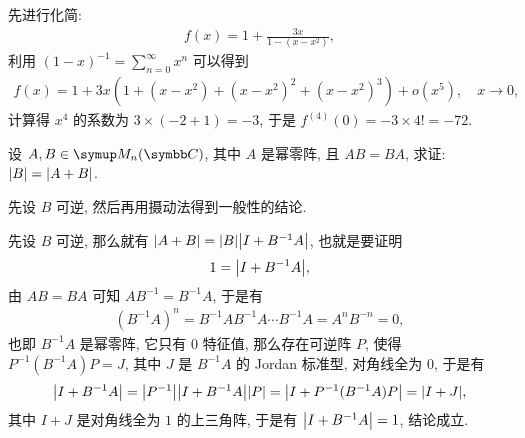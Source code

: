 \begin{exercise}[series=exer]
\begin{answer}
        先进行化简:
        \begin{align*}
            f(x) = 1 + \frac{3x}{1-(x - x^{2})},
        \end{align*}
        利用 $ (1 - x)^{-1} = \sum_{n = 0}^{\infty} x^{n} $ 可以得到
        \begin{align*}
            f(x) = 1 + 3x (1 + (x - x^{2}) + (x - x^{2})^{2} + (x - x^{2})^{3}) + o(x^{5}), \quad x \to 0,
        \end{align*}
        计算得 $ x^{4} $ 的系数为 $ 3 \times (-2 + 1) = -3 $, 于是 $ f^{(4)}(0) = -3 \times 4! = -72 $.
    \end{answer}
    \item 设 $ A, B \in \MM[\C] $, 其中 $ A $ 是幂零阵, 且 $ AB = BA $, 求证: $ \abs{B} = \abs{A + B} $.
    \begin{hint}
        先设 $ B $ 可逆, 然后再用摄动法得到一般性的结论.
    \end{hint}
    \begin{answer}
        先设 $ B $ 可逆, 那么就有 $ \abs{A + B} = \abs{B}\abs{I + B^{-1}A} $, 也就是要证明
        \begin{align*}
            1 = \abs{I + B^{-1}A},
        \end{align*}
        由 $ AB = BA $ 可知 $ AB^{-1} = B^{-1}A $, 于是有
        \begin{align*}
            (B^{-1}A)^{n} = B^{-1}AB^{-1}A\dotsm B^{-1}A = A^{n}B^{-n} = 0,
        \end{align*}
        也即 $ B^{-1}A $ 是幂零阵, 它只有 $ 0 $ 特征值, 那么存在可逆阵 $ P $, 使得 $ P^{-1}(B^{-1}A)P = J $, 其中 $ J $ 是 $ B^{-1}A $ 的 Jordan 标准型, 对角线全为 $ 0 $, 于是有
        \begin{align*}
            \abs{I + B^{-1}A} = \abs{P^{-1}}\abs{I + B^{-1}A}\abs{P} = \abs{I + P^{-1}(B^{-1}A)P} = \abs{I + J},
        \end{align*} 
        其中 $ I + J $ 是对角线全为 $ 1 $ 的上三角阵, 于是有 $ \abs{I + B^{-1}A} = 1 $, 结论成立. 


\end{answer}
\end{exercise}
